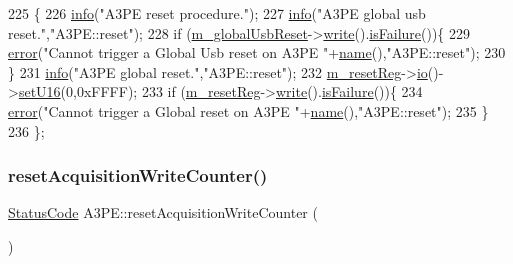 \begin{DoxyCode}
225                \{
226         \hyperlink{classObject_a644fd329ea4cb85f54fa6846484b84a8}{info}(\textcolor{stringliteral}{"A3PE reset procedure."});
227     \hyperlink{classObject_a644fd329ea4cb85f54fa6846484b84a8}{info}(\textcolor{stringliteral}{"A3PE global usb reset."},\textcolor{stringliteral}{"A3PE::reset"});
228     \textcolor{keywordflow}{if} (\hyperlink{classA3PE_abd71e0c273f9e211e1a9302019129aff}{m\_globalUsbReset}->\hyperlink{classIOobject_a9f6984bc9f0fadcf800f1be2523ac744}{write}().\hyperlink{classStatusCode_a5dd22dc6eb2c52fc4cabc58f6dea2eb7}{isFailure}())\{
229       \hyperlink{classObject_a204a95f57818c0f811933917a30eff45}{error}(\textcolor{stringliteral}{"Cannot trigger a Global Usb reset on A3PE "}+\hyperlink{classObject_a300f4c05dd468c7bb8b3c968868443c1}{name}(),\textcolor{stringliteral}{"A3PE::reset"});
230     \}
231     \hyperlink{classObject_a644fd329ea4cb85f54fa6846484b84a8}{info}(\textcolor{stringliteral}{"A3PE global reset."},\textcolor{stringliteral}{"A3PE::reset"});
232         \hyperlink{classA3PE_ab4db5f00976e5095686f108c8febf702}{m\_resetReg}->\hyperlink{classIOobject_af04fb94137c3d86849f478ac5afab5d1}{io}()->\hyperlink{classIOdata_aa9ade5ce3944c8e2b831533b6f876caf}{setU16}(0,0xFFFF);
233     \textcolor{keywordflow}{if} (\hyperlink{classA3PE_ab4db5f00976e5095686f108c8febf702}{m\_resetReg}->\hyperlink{classIOobject_a9f6984bc9f0fadcf800f1be2523ac744}{write}().\hyperlink{classStatusCode_a5dd22dc6eb2c52fc4cabc58f6dea2eb7}{isFailure}())\{
234       \hyperlink{classObject_a204a95f57818c0f811933917a30eff45}{error}(\textcolor{stringliteral}{"Cannot trigger a Global reset on A3PE "}+\hyperlink{classObject_a300f4c05dd468c7bb8b3c968868443c1}{name}(),\textcolor{stringliteral}{"A3PE::reset"});
235     \}
236   \};
\end{DoxyCode}
\mbox{\label{classA3PE_a557ea9cfa97a03db1514af2fe8936df3}} 
\subsubsection{\texorpdfstring{reset\+Acquisition\+Write\+Counter()}{resetAcquisitionWriteCounter()}}
{\footnotesize\ttfamily \hyperlink{classStatusCode}{Status\+Code} A3\+P\+E\+::reset\+Acquisition\+Write\+Counter (\begin{DoxyParamCaption}{ }\end{DoxyParamCaption})}



